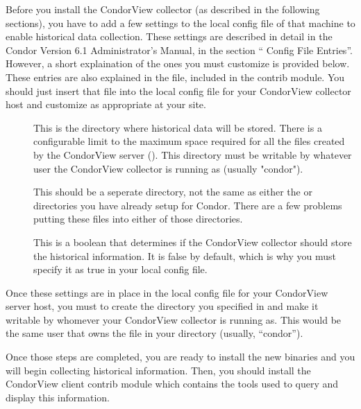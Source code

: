 Before you install the CondorView collector (as described in the
following sections), you have to add a few settings to the local
config file of that machine to enable historical data collection.
These settings are described in detail in the Condor Version 6.1
Administrator's Manual, in the section `` Config File
Entries''.
However, a short explaination of the ones you must customize is
provided below. 
These entries are also explained in the
 file, included
in the contrib module.
You should just insert that file into the local config file for your
CondorView collector host and customize as appropriate at your site.  
\begin{description}

\item[] This is the directory where
historical data will be stored.
There is a configurable limit to the maximum space required for all
the files created by the CondorView server
(). 
This directory must be writable by whatever user the CondorView
collector is running as (usually "condor").  

\Note This should be a seperate directory, not the same as either the
 or  directories you have already setup for
Condor. 
There are a few problems putting these files into either of those
directories.

\item[] This is a boolean that determines
if the CondorView collector should store the historical information.
It is false by default, which is why you must specify it as true in
your local config file.

\end{description}

Once these settings are in place in the local config file for your
CondorView server host, you must to create the directory you specified
in  and make it writable by whomever your
CondorView collector is running as.
This would be the same user that owns the  file in
your  directory (usually, ``condor'').

Once those steps are completed, you are ready to install the new
binaries and you will begin collecting historical information.
Then, you should install the CondorView client contrib module which
contains the tools used to query and display this information.


